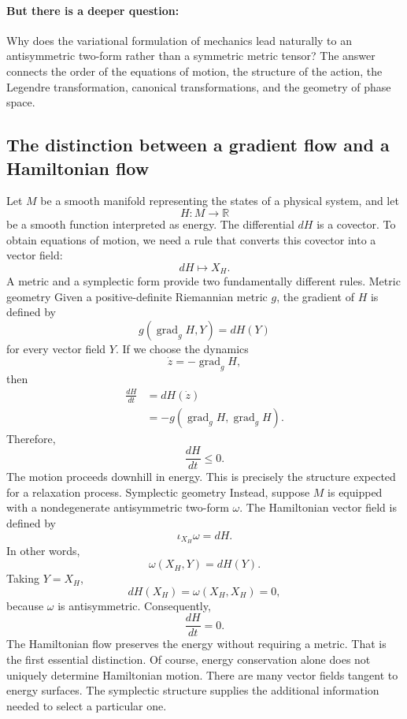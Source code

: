 \paragraph{But there is a deeper question:}
Why does the variational formulation of mechanics lead naturally to an
antisymmetric two-form rather than a symmetric metric tensor? The answer
connects the order of the equations of motion, the structure of the action, the
Legendre transformation, canonical transformations, and the geometry of phase
space.

\subsection{The distinction between a gradient flow and a Hamiltonian flow}
Let \(M\) be a smooth manifold representing the states of a physical system,
and let
\[
H:M\longrightarrow\mathbb R
\]
be a smooth function interpreted as energy.
The differential \(dH\) is a covector. To obtain equations of motion, we need a
rule that converts this covector into a vector field:
\[
dH\longmapsto X_H.
\]
A metric and a symplectic form provide two fundamentally different rules.
Metric geometry
Given a positive-definite Riemannian metric \(g\), the gradient of \(H\) is
defined by
\[
\boxed{g(\operatorname{grad}_g H,Y)=dH(Y)}
\]
for every vector field \(Y\).
If we choose the dynamics
\[
\dot z=-\operatorname{grad}_gH,
\]
then
\[
\begin{aligned}
\frac{dH}{dt}
&=dH(\dot z)\\
&=-g(\operatorname{grad}_gH,\operatorname{grad}_gH).
\end{aligned}
\]
Therefore,
\[
\boxed{\frac{dH}{dt}\leq0.}
\]
The motion proceeds downhill in energy.
This is precisely the structure expected for a relaxation process.
Symplectic geometry
Instead, suppose \(M\) is equipped with a nondegenerate antisymmetric two-form
\(\omega\).
The Hamiltonian vector field is defined by
\[
\boxed{\iota_{X_H}\omega=dH.}
\]
In other words,
\[
\omega(X_H,Y)=dH(Y).
\]
Taking \(Y=X_H\),
\[
dH(X_H)=\omega(X_H,X_H)=0,
\]
because \(\omega\) is antisymmetric.
Consequently,
\[
\boxed{\frac{dH}{dt}=0.}
\]
The Hamiltonian flow preserves the energy without requiring a metric.
That is the first essential distinction. 
Of course, energy conservation alone does not uniquely determine Hamiltonian
motion. There are many vector fields tangent to energy surfaces. The symplectic
structure supplies the additional information needed to select a particular
one.

